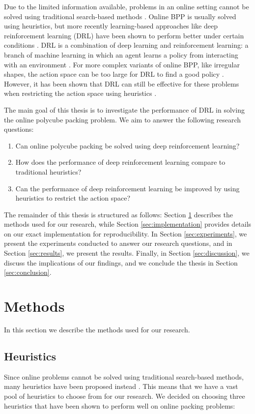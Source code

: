 \documentclass[conference]{IEEEtran}
\begin{document}
Due to the limited information available, problems in an online setting cannot be solved using traditional search-based methods \cite{Zhao2022pct}.
Online BPP is usually solved using heuristics, but more recently learning-based approaches like deep reinforcement learning (DRL) have been shown to perform better under certain conditions \cite{Zhao2022pct}.
DRL is a combination of deep learning and reinforcement learning: a branch of machine learning in which an agent learns a policy from interacting with an environment \cite{Mousavi2018}.
For more complex variants of online BPP, like irregular shapes, the action space can be too large for DRL to find a good policy \cite{Zhao2022pct}.
However, it has been shown that DRL can still be effective for these problems when restricting the action space using heuristics \cite{Zhao2022pct}\cite{Zhao2022general}.

The main goal of this thesis is to investigate the performance of DRL in solving the online polycube packing problem.
We aim to answer the following research questions:

\begin{enumerate}
    \item Can online polycube packing be solved using deep reinforcement learning?
    \item How does the performance of deep reinforcement learning compare to traditional heuristics?
    \item Can the performance of deep reinforcement learning be improved by using heuristics to restrict the action space?
\end{enumerate}

The remainder of this thesis is structured as follows:
Section \ref{sec:methods} describes the methods used for our research, while Section \ref{sec:implementation} provides details on our exact implementation for reproducibility.
In Section \ref{sec:experiments}, we present the experiments conducted to answer our research questions, and in Section \ref{sec:results}, we present the results.
Finally, in Section \ref{sec:discussion}, we discuss the implications of our findings, and we conclude the thesis in Section \ref{sec:conclusion}.

%
%
\section{Methods} \label{sec:methods}
In this section we describe the methods used for our research.

\subsection{Heuristics} \label{sec:methods:heuristics}
Since online problems cannot be solved using traditional search-based methods, many heuristics have been proposed instead \cite{Zhao2022pct}.
This means that we have a vast pool of heuristics to choose from for our research.
We decided on choosing three heuristics that have been shown to perform well on online packing problems:
\end{document}
